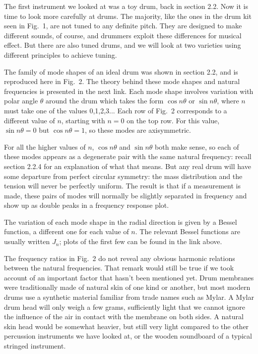 

  The first instrument we looked at was a toy drum, back in section 2.2. Now it 
  is time to look more carefully at drums. The majority, like the ones in the 
  drum kit seen in Fig.\ 1, are not tuned to any definite pitch. They are 
  designed to make different sounds, of course, and drummers exploit these 
  differences for musical effect. But there are also tuned drums, and we will 
  look at two varieties using different principles to achieve tuning. 

  The family of mode shapes of an ideal drum was shown in section 2.2, and is 
  reproduced here in Fig.\ 2. The theory behind these mode shapes and natural 
  frequencies is presented in the next link. Each mode shape involves variation 
  with polar angle $\theta$ around the drum which takes the form $\cos n 
  \theta$ or $\sin n \theta$, where $n$ must take one of the values 0,1,2,3... 
  Each row of Fig.\ 2 corresponds to a different value of $n$, starting with 
  $n=0$ on the top row. For this value, $\sin n \theta =0$ but $\cos n \theta = 
  1$, so these modes are axisymmetric. 

  For all the higher values of $n$, $\cos n \theta$ and $\sin n \theta$ both 
  make sense, so each of these modes appears as a degenerate pair with the same 
  natural frequency: recall section 2.2.4 for an explanation of what that 
  means. But any real drum will have some departure from perfect circular 
  symmetry: the mass distribution and the tension will never be perfectly 
  uniform. The result is that if a measurement is made, these pairs of modes 
  will normally be slightly separated in frequency and show up as double peaks 
  in a frequency response plot. 

  The variation of each mode shape in the radial direction is given by a Bessel 
  function, a different one for each value of $n$. The relevant Bessel 
  functions are usually written $J_n$; plots of the first few can be found in 
  the link above. 

  The frequency ratios in Fig.\ 2 do not reveal any obvious harmonic relations 
  between the natural frequencies. That remark would still be true if we took 
  account of an important factor that hasn't been mentioned yet. Drum membranes 
  were traditionally made of natural skin of one kind or another, but most 
  modern drums use a synthetic material familiar from trade names such as 
  Mylar. A Mylar drum head will only weigh a few grams, sufficiently light that 
  we cannot ignore the influence of the air in contact with the membrane on 
  both sides. A natural skin head would be somewhat heavier, but still very 
  light compared to the other percussion instruments we have looked at, or the 
  wooden soundboard of a typical stringed instrument. 

